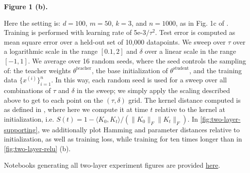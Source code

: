 \documentclass{article}
\theoremstyle{plain}
\theoremstyle{definition}
\theoremstyle{remark}
\begin{document}
\textbf{Figure 1 (b).}

Here the setting is: $d=100$, $m=50$, $k=3$, and $n=1000$, as in Fig. 1c of \cite{chizat2019lazy}. Training is performed with learning rate of 5e-3$/\tau^2$. Test error is computed as mean square error over a held-out set of 10,000 datapoints.
%
We sweep over $\tau$ over a logarithmic scale in the range $[0.1, 2]$ and $\delta$ over a linear scale in the range $[-1, 1]$. We average over 16 random seeds, where the seed controls the sampling of: the teacher weights $\theta^\mathrm{teacher}$, the base initialization of $\theta^\mathrm{student}$, and the training data $\{x^{(i)}\}_{i=1}^n$. In this way, each random seed is used for a sweep over all combinations of $\tau$ and $\delta$ in the sweep; we simply apply the scaling described above to get to each point on the $(\tau, \delta)$ grid.
%
The kernel distance computed is as defined in \cite{fort2020deep}, where here we compute it at time $t$ relative to the kernel at initialization, i.e. $S(t) = 1 - \langle K_{0}, K_{t}\rangle / \left(\|K_{0}\|_F\|K_{t}\|_F\right)$. In \cref{fig:two-layer-supporting}, we additionally plot Hamming and parameter distances relative to initialization, as well as training loss, while training for ten times longer than in \cref{fig:two-layer-relu} (b).

Notebooks generating all two-layer experiment figures are provided \href{https://github.com/allanraventos/getrichquick/blob/main/two-layer-relu}{here}.
\end{document}

